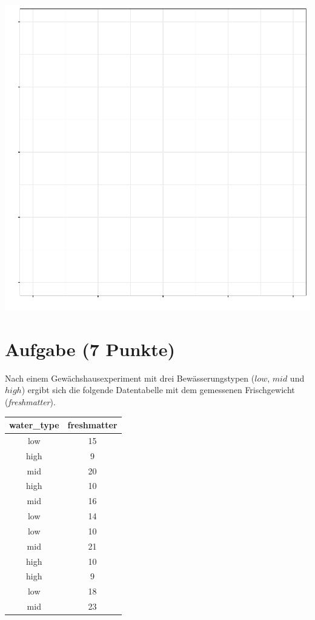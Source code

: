 \documentclass[a4paper, 10pt]{scrartcl}\usepackage[]{graphicx}\usepackage[]{xcolor}
\makeatletter
\def\maxwidth{ %
  \ifdim\Gin@nat@width>\linewidth
    \linewidth
  \else
    \Gin@nat@width
  \fi
}
\makeatother
\begin{document}
{\centering \includegraphics[width=\maxwidth]{img/desc-01-1} 

}


 
\clearpage

\section{Aufgabe \hfill (7 Punkte)}

Nach einem Gew{\"a}chshausexperiment mit drei Bew{\"a}sserungstypen ($low$, $mid$
und $high$) ergibt sich die folgende Datentabelle mit dem gemessenen
Frischgewicht (\textit{freshmatter}).

\begin{table}[!h]
\centering
\begin{tabular}{cc}
\toprule
water\_type & freshmatter\\
\midrule
low & 15\\
high & 9\\
mid & 20\\
high & 10\\
mid & 16\\
\addlinespace
low & 14\\
low & 10\\
mid & 21\\
high & 10\\
high & 9\\
\addlinespace
low & 18\\
mid & 23\\
\bottomrule
\end{tabular}
\end{table}
\end{document}
